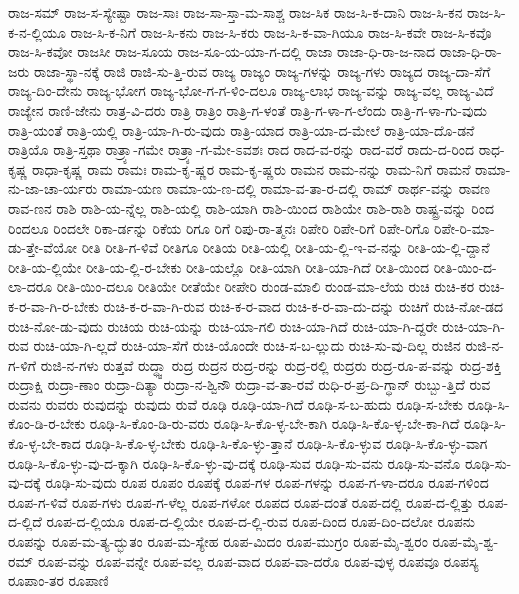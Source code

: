 {ರಾಜ-ಸಮ್
ರಾಜ-ಸ-ಸ್ಯೇಷ್ಟಾ
ರಾಜ-ಸಾಃ
ರಾಜ-ಸಾ-ಸ್ತಾ-ಮ-ಸಾಶ್ಚ
ರಾಜ-ಸಿಕ
ರಾಜ-ಸಿ-ಕ-ದಾನಿ
ರಾಜ-ಸಿ-ಕನ
ರಾಜ-ಸಿ-ಕ-ನ-ಲ್ಲಿಯೂ
ರಾಜ-ಸಿ-ಕ-ನಿಗೆ
ರಾಜ-ಸಿ-ಕನು
ರಾಜ-ಸಿ-ಕರು
ರಾಜ-ಸಿ-ಕ-ವಾ-ಗಿಯೂ
ರಾಜ-ಸಿ-ಕವೇ
ರಾಜ-ಸಿ-ಕವೊ
ರಾಜ-ಸಿ-ಕವೋ
ರಾಜಸೀ
ರಾಜ-ಸೂಯ
ರಾಜ-ಸೂ-ಯ-ಯಾ-ಗ-ದಲ್ಲಿ
ರಾಜಾ
ರಾಜಾ-ಧಿ-ರಾ-ಜ-ನಾದ
ರಾಜಾ-ಧಿ-ರಾ-ಜರು
ರಾಜಾ-ಸ್ಥಾ-ನಕ್ಕೆ
ರಾಜಿ
ರಾಜಿ-ಸು-ತ್ತಿ-ರುವ
ರಾಜ್ಯ
ರಾಜ್ಯಂ
ರಾಜ್ಯ-ಗಳನ್ನು
ರಾಜ್ಯ-ಗಳು
ರಾಜ್ಯದ
ರಾಜ್ಯ-ದಾ-ಸೆಗೆ
ರಾಜ್ಯ-ದಿಂ-ದೇನು
ರಾಜ್ಯ-ಭೋಗ
ರಾಜ್ಯ-ಭೋ-ಗ-ಗ-ಳಿಂ-ದಲೂ
ರಾಜ್ಯ-ಲಾಭ
ರಾಜ್ಯ-ವನ್ನು
ರಾಜ್ಯ-ವಲ್ಲ
ರಾಜ್ಯ-ವಿದೆ
ರಾಜ್ಯೇನ
ರಾಣಿ-ಜೇನು
ರಾತ್ರ-ವಿ-ದರು
ರಾತ್ರಿ
ರಾತ್ರಿಂ
ರಾತ್ರಿ-ಗ-ಳಂತೆ
ರಾತ್ರಿ-ಗ-ಳಾ-ಗ-ಲೆಂದು
ರಾತ್ರಿ-ಗ-ಳಾ-ಗು-ವುದು
ರಾತ್ರಿ-ಯಂತೆ
ರಾತ್ರಿ-ಯಲ್ಲಿ
ರಾತ್ರಿ-ಯಾ-ಗಿ-ರು-ವುದು
ರಾತ್ರಿ-ಯಾದ
ರಾತ್ರಿ-ಯಾ-ದ-ಮೇಲೆ
ರಾತ್ರಿ-ಯಾ-ದೊ-ಡನೆ
ರಾತ್ರಿಯೊ
ರಾತ್ರಿ-ಸ್ತಥಾ
ರಾತ್ರ್ಯಾ-ಗಮೇ
ರಾತ್ರ್ಯಾ-ಗ-ಮೇ-ಽವಶಃ
ರಾದ
ರಾದ-ವ-ರನ್ನು
ರಾದ-ವರೆ
ರಾದು-ದ-ರಿಂದ
ರಾಧ-ಕೃಷ್ಣ
ರಾಧಾ-ಕೃಷ್ಣ
ರಾಮ
ರಾಮಃ
ರಾಮ-ಕೃ-ಷ್ಣರ
ರಾಮ-ಕೃ-ಷ್ಣರು
ರಾಮನ
ರಾಮ-ನನ್ನು
ರಾಮ-ನಿಗೆ
ರಾಮನೆ
ರಾಮಾ-ನು-ಜಾ-ಚಾ-ರ್ಯರು
ರಾಮಾ-ಯಣ
ರಾಮಾ-ಯ-ಣ-ದಲ್ಲಿ
ರಾಮಾ-ವ-ತಾ-ರ-ದಲ್ಲಿ
ರಾಮ್
ರಾರ್ಥ-ವನ್ನು
ರಾವಣ
ರಾವ-ಣನ
ರಾಶಿ
ರಾಶಿ-ಯ-ನ್ನೆಲ್ಲ
ರಾಶಿ-ಯಲ್ಲಿ
ರಾಶಿ-ಯಾಗಿ
ರಾಶಿ-ಯಿಂದ
ರಾಶಿಯೇ
ರಾಶಿ-ರಾಶಿ
ರಾಷ್ಟ್ರ-ವನ್ನು
ರಿಂದ
ರಿಂದಲೂ
ರಿಂದಲೇ
ರಿಕಾ-ರ್ಡನ್ನು
ರಿಕೆಯ
ರಿಗೂ
ರಿಗೆ
ರಿಪು-ರಾ-ತ್ಮನಃ
ರಿಪೇರಿ
ರಿಪೇ-ರಿಗೆ
ರಿಪೇ-ರಿಗೊ
ರಿಪೇ-ರಿ-ಮಾ-ಡು-ತ್ತೇ-ವೆಯೋ
ರೀತಿ
ರೀತಿ-ಗ-ಳಿವೆ
ರೀತಿಗೂ
ರೀತಿಯ
ರೀತಿ-ಯಲ್ಲಿ
ರೀತಿ-ಯ-ಲ್ಲಿ-ಇ-ವ-ನನ್ನು
ರೀತಿ-ಯ-ಲ್ಲಿ-ದ್ದಾನೆ
ರೀತಿ-ಯ-ಲ್ಲಿಯೇ
ರೀತಿ-ಯ-ಲ್ಲಿ-ರ-ಬೇಕು
ರೀತಿ-ಯಲ್ಲೊ
ರೀತಿ-ಯಾಗಿ
ರೀತಿ-ಯಾ-ಗಿದೆ
ರೀತಿ-ಯಿಂದ
ರೀತಿ-ಯಿಂ-ದ-ಲಾ-ದರೂ
ರೀತಿ-ಯಿಂ-ದಲೂ
ರೀತಿಯೇ
ರೀತೆಯೇ
ರೀಪೇರಿ
ರುಂಡ-ಮಾಲಿ
ರುಂಡ-ಮಾ-ಲೆಯ
ರುಚಿ
ರುಚಿ-ಕರ
ರುಚಿ-ಕ-ರ-ವಾ-ಗಿ-ರ-ಬೇಕು
ರುಚಿ-ಕ-ರ-ವಾ-ಗಿ-ರುವ
ರುಚಿ-ಕ-ರ-ವಾದ
ರುಚಿ-ಕ-ರ-ವಾ-ದು-ದನ್ನು
ರುಚಿಗೆ
ರುಚಿ-ನೋ-ಡದ
ರುಚಿ-ನೋ-ಡು-ವುದು
ರುಚಿಯ
ರುಚಿ-ಯನ್ನು
ರುಚಿ-ಯಾ-ಗಲಿ
ರುಚಿ-ಯಾ-ಗಿದೆ
ರುಚಿ-ಯಾ-ಗಿ-ದ್ದರೇ
ರುಚಿ-ಯಾ-ಗಿ-ರುವ
ರುಚಿ-ಯಾ-ಗಿ-ಲ್ಲದೆ
ರುಚಿ-ಯಾ-ಸೆಗೆ
ರುಚಿ-ಯೊಂದೇ
ರುಚಿ-ಸ-ಬ-ಲ್ಲುದು
ರುಚಿ-ಸು-ವು-ದಿಲ್ಲ
ರುಜಿನ
ರುಜಿ-ನ-ಗ-ಳಿಗೆ
ರುಜಿ-ನ-ಗಳು
ರುತ್ತವೆ
ರುದ್ಧ್ವಾ
ರುದ್ರ
ರುದ್ರನ
ರುದ್ರ-ರನ್ನು
ರುದ್ರ-ರಲ್ಲಿ
ರುದ್ರರು
ರುದ್ರ-ರೂ-ಪ-ವನ್ನು
ರುದ್ರ-ಶಕ್ತಿ
ರುದ್ರಾಕ್ಷಿ
ರುದ್ರಾ-ಣಾಂ
ರುದ್ರಾ-ದಿತ್ಯಾ
ರುದ್ರಾ-ನ-ಶ್ವಿನೌ
ರುದ್ರಾ-ವ-ತಾ-ರವೆ
ರುಧಿ-ರ-ಪ್ರ-ದಿ-ಗ್ಧಾನ್
ರುಬ್ಬು-ತ್ತಿದೆ
ರುವ
ರುವನು
ರುವರು
ರುವುದನ್ನು
ರುವುದು
ರುವೆ
ರೂಢಿ
ರೂಢಿ-ಯಾ-ಗಿದೆ
ರೂಢಿ-ಸ-ಬ-ಹುದು
ರೂಢಿ-ಸ-ಬೇಕು
ರೂಢಿ-ಸಿ-ಕೊಂ-ಡಿ-ರ-ಬೇಕು
ರೂಢಿ-ಸಿ-ಕೊಂ-ಡಿ-ರು-ವರು
ರೂಢಿ-ಸಿ-ಕೊ-ಳ್ಳ-ಬೇ-ಕಾಗಿ
ರೂಢಿ-ಸಿ-ಕೊ-ಳ್ಳ-ಬೇ-ಕಾ-ಗಿದೆ
ರೂಢಿ-ಸಿ-ಕೊ-ಳ್ಳ-ಬೇ-ಕಾದ
ರೂಢಿ-ಸಿ-ಕೊ-ಳ್ಳ-ಬೇಕು
ರೂಢಿ-ಸಿ-ಕೊ-ಳ್ಳು-ತ್ತಾನೆ
ರೂಢಿ-ಸಿ-ಕೊ-ಳ್ಳುವ
ರೂಢಿ-ಸಿ-ಕೊ-ಳ್ಳು-ವಾಗ
ರೂಢಿ-ಸಿ-ಕೊ-ಳ್ಳು-ವು-ದ-ಕ್ಕಾಗಿ
ರೂಢಿ-ಸಿ-ಕೊ-ಳ್ಳು-ವು-ದಕ್ಕೆ
ರೂಢಿ-ಸುವ
ರೂಢಿ-ಸು-ವನು
ರೂಢಿ-ಸು-ವನೊ
ರೂಢಿ-ಸು-ವು-ದಕ್ಕೆ
ರೂಢಿ-ಸು-ವುದು
ರೂಪ
ರೂಪಂ
ರೂಪಕ್ಕೆ
ರೂಪ-ಗಳ
ರೂಪ-ಗಳನ್ನು
ರೂಪ-ಗ-ಳಾ-ದರೂ
ರೂಪ-ಗಳಿಂದ
ರೂಪ-ಗ-ಳಿವೆ
ರೂಪ-ಗಳು
ರೂಪ-ಗ-ಳೆಲ್ಲ
ರೂಪ-ಗಳೋ
ರೂಪದ
ರೂಪ-ದಂತೆ
ರೂಪ-ದಲ್ಲಿ
ರೂಪ-ದ-ಲ್ಲಿತ್ತು
ರೂಪ-ದ-ಲ್ಲಿದೆ
ರೂಪ-ದ-ಲ್ಲಿಯೂ
ರೂಪ-ದ-ಲ್ಲಿಯೇ
ರೂಪ-ದ-ಲ್ಲಿ-ರುವ
ರೂಪ-ದಿಂದ
ರೂಪ-ದಿಂ-ದಲೋ
ರೂಪನು
ರೂಪನ್ನು
ರೂಪ-ಮ-ತ್ಯ-ದ್ಭುತಂ
ರೂಪ-ಮ-ಸ್ಯೇಹ
ರೂಪ-ಮಿದಂ
ರೂಪ-ಮುಗ್ರಂ
ರೂಪ-ಮೈ-ಶ್ವರಂ
ರೂಪ-ಮೈ-ಶ್ವ-ರಮ್
ರೂಪ-ವನ್ನು
ರೂಪ-ವನ್ನೇ
ರೂಪ-ವಲ್ಲ
ರೂಪ-ವಾದ
ರೂಪ-ವಾ-ದರೊ
ರೂಪ-ವುಳ್ಳ
ರೂಪವೂ
ರೂಪಸ್ಯ
ರೂಪಾಂ-ತರ
ರೂಪಾಣಿ
}
